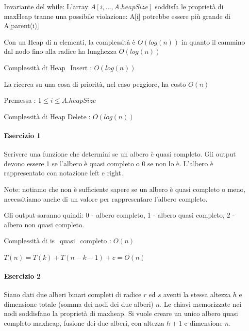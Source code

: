 \documentclass[11pt,a4paper,twoside,openright]{book}
\let\oldparagraph\paragraph
\renewcommand{\paragraph}[1]{\oldparagraph{#1}\mbox{}}
\begin{document}
{Invariante del while: L'array $A[i,\ldots,A.heapSize]$ soddisfa le proprietà di maxHeap tranne una possibile violazione: A{[}i{]} potrebbe essere più grande di A{[}parent(i){]}}

{Con un Heap di n elementi, la complessità è $O(log(n))$ in quanto il cammino dal nodo fino alla radice ha lunghezza }$O(log(n))$



{Complessità di Heap\_Insert : }$O(log(n))$

{La ricerca su una cosa di priorità, nel caso peggiore, ha costo }$O(n)$

{Premessa : $1 \leq i \leq A.heapSize$}



{Complessità di Heap Delete : }$O(log(n))$

\paragraph{Esercizio 1}

{Scrivere una funzione che determini se un albero è quasi completo. Gli output devono essere 1 se l'albero è quasi completo o 0 se non lo è. }{L'albero è rappresentato con notazione left e right.}

{Note: notiamo che non è sufficiente sapere se un albero è quasi completo o meno, necessitiamo anche di un valore per rappresentare l'albero completo.}

{Gli output saranno quindi: 0 - albero completo, 1 - albero quasi completo, 2 - albero non quasi completo.}





{Complessità di is\_quasi\_completo : $O(n)$}

$T(n) = T(k) + T(n-k-1) + c = O(n)$

\paragraph{Esercizio 2}

{Siano dati due alberi binari completi di radice $r$ ed $s$ aventi la stessa altezza $h$ e dimensione totale (somma dei nodi dei due alberi) $n$. Le chiavi memorizzate nei nodi soddisfano la proprietà di maxheap. Si vuole creare un unico albero quasi completo maxheap, fusione dei due alberi, con altezza $h+1$ e dimensione $n$.}
\end{document}
